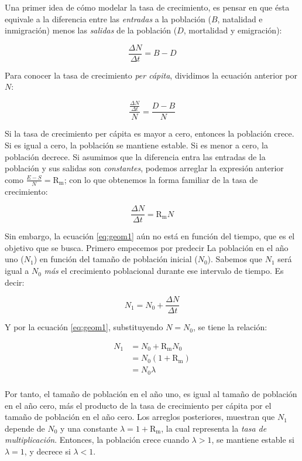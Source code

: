 \documentclass[12pt,letterpaper,]{book}
\begin{document}
Una primer idea de cómo modelar la tasa de crecimiento, es pensar en que
ésta equivale a la diferencia entre las \emph{entradas} a la población
(\(B\), natalidad e inmigración) menos las \emph{salidas} de la
población (\(D\), mortalidad y emigración):

\[
\frac{\Delta N}{\Delta t} = B-D
\]

Para conocer la tasa de crecimiento \emph{per cápita}, dividimos la
ecuación anterior por \(N\):

\[
\frac{\frac{\Delta N}{\Delta t}}{N} = \frac{D-B}{N}
\]

Si la tasa de crecimiento per cápita es mayor a cero, entonces la
población crece. Si es igual a cero, la población se mantiene estable.
Si es menor a cero, la población decrece. Si asumimos que la diferencia
entra las entradas de la población y sus salidas son \emph{constantes},
podemos arreglar la expresión anterior como
\(\frac{E-S}{N}=\mathrm{R_m}\); con lo que obtenemos la forma familiar
de la tasa de crecimiento:

\begin{equation}
\frac{\Delta N}{\Delta t}=\mathrm{R_m} N
 \label{eq:geom1}
\end{equation}

Sin embargo, la ecuación \eqref{eq:geom1} aún no está en función del
tiempo, que es el objetivo que se busca. Primero empecemos por predecir
La población en el año uno (\(N_1\)) en función del tamaño de población
inicial (\(N_0\)). Sabemos que \(N_1\) será igual a \(N_0\) \emph{más}
el crecimiento poblacional durante ese intervalo de tiempo. Es decir:

\[
N_1 = N_0 + \frac{\Delta N}{\Delta t}
\]

Y por la ecuación \eqref{eq:geom1}, substituyendo \(N = N_0\), se tiene la
relación:

\begin{equation}
\begin{split}
N_1 &= N_0 + \mathrm{R_m} N_0\\
    &= N_0 \left( 1 + \mathrm{R_m} \right)\\
    &= N_0 \lambda\\
\end{split}
\end{equation}

Por tanto, el tamaño de población en el año uno, es igual al tamaño de
población en el año cero, más el producto de la tasa de crecimiento per
cápita por el tamaño de población en el año cero. Los arreglos
posteriores, muestran que \(N_1\) depende de \(N_0\) y una constante
\(\lambda = 1+\mathrm{R_m}\), la cual representa la \emph{tasa de
multiplicación}. Entonces, la población
crece cuando \(\lambda > 1\), se mantiene estable si \(\lambda = 1\), y
decrece si \(\lambda < 1\).
\end{document}
